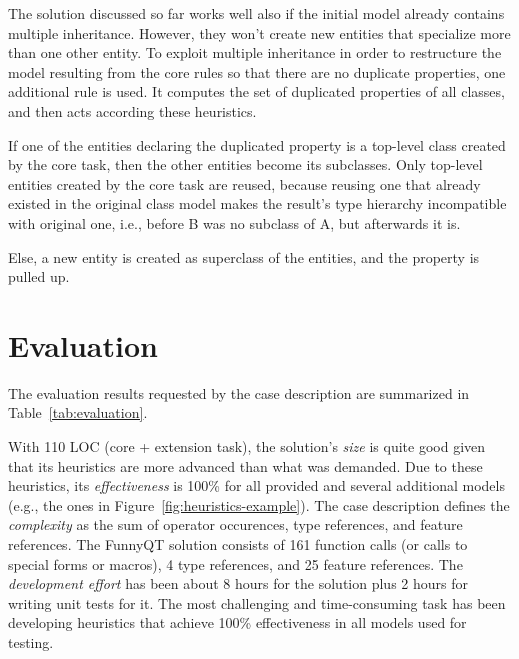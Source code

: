\documentclass[submission]{eptcs}
\begin{document}
The solution discussed so far works well also if the initial model already
contains multiple inheritance.  However, they won't create new entities that
specialize more than one other entity.  To exploit multiple inheritance in
order to restructure the model resulting from the core rules so that there are
no duplicate properties, one additional rule is used.  It computes the set of
duplicated properties of all classes, and then acts according these heuristics.
\begin{compactenum}
\item If one of the entities declaring the duplicated property is a top-level
  class created by the core task, then the other entities become its
  subclasses.  Only top-level entities created by the core task are reused,
  because reusing one that already existed in the original class model makes
  the result's type hierarchy incompatible with original one, i.e., before B
  was no subclass of A, but afterwards it is.
\item Else, a new entity is created as superclass of the entities, and the
  property is pulled up.
\end{compactenum}


\section{Evaluation}
\label{sec:evaluation}

The evaluation results requested by the case description
\cite{cdrestructcasedesc} are summarized in Table~\ref{tab:evaluation}.

With 110 LOC (core + extension task), the solution's \emph{size} is quite good
given that its heuristics are more advanced than what was demanded.  Due to
these heuristics, its \emph{effectiveness} is 100\% for all provided and
several additional models (e.g., the ones in
Figure~\ref{fig:heuristics-example}).  The case description defines the
\emph{complexity} as the sum of operator occurences, type references, and
feature references.  The FunnyQT solution consists of 161 function calls (or
calls to special forms or macros), 4 type references, and 25 feature
references.  The \emph{development effort} has been about 8 hours for the
solution plus 2 hours for writing unit tests for it.  The most challenging and
time-consuming task has been developing heuristics that achieve 100\%
effectiveness in all models used for testing.
\end{document}
